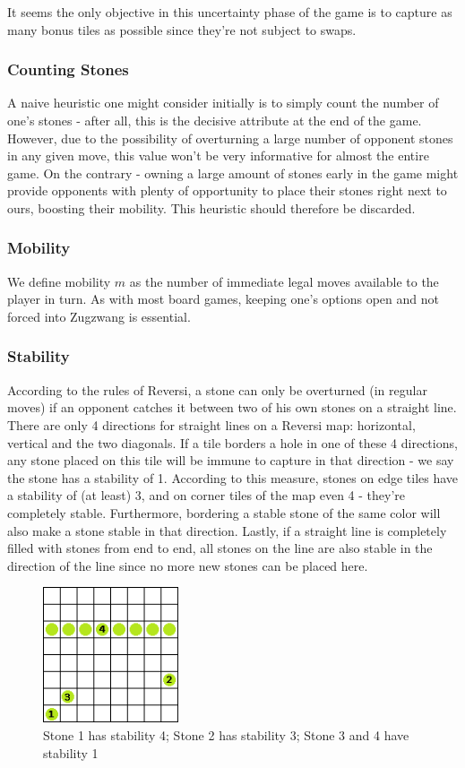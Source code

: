 It seems the only objective in this uncertainty phase of the game is to capture as many bonus tiles as possible since they're not subject to swaps.


\subsubsection{Counting Stones}
A naive heuristic one might consider initially is to simply count the number of one's stones - after all, this is the decisive attribute at the end of the game. However, due to the possibility of overturning a large number of opponent stones in any given move, this value won't be very informative for almost the entire game. On the contrary - owning a large amount of stones early in the game might provide opponents with plenty of opportunity to place their stones right next to ours, boosting their mobility. This heuristic should therefore be discarded.

 
\subsubsection{Mobility}
We define mobility $m$ as the number of immediate legal moves available to the player in turn. As with most board games, keeping one's options open and not forced into Zugzwang is essential. 

 
\subsubsection{Stability}
According to the rules of Reversi, a stone can only be overturned (in regular moves) if an opponent catches it between two of his own stones on a straight line. There are only 4 directions for straight lines on a Reversi map: horizontal, vertical and the two diagonals. If a tile borders a hole in one of these 4 directions, any stone placed on this tile will be immune to capture in that direction - we say the stone has a stability of 1. According to this measure, stones on edge tiles have a stability of (at least) 3, and on corner tiles of the map even 4 - they're completely stable. Furthermore, bordering a stable stone of the same color will also make a stone stable in that direction. Lastly, if a straight line is completely filled with stones from end to end, all stones on the line are also stable in the direction of the line since no more new stones can be placed here.

\begin{figure}[H]
    \centering
    \includegraphics[height=4cm]{pictures/assignment1/Stability.png}
    \caption{Stone 1 has stability 4; Stone 2 has stability 3; Stone 3 and 4 have stability 1}
    \label{fig:Stability}
\end{figure}

